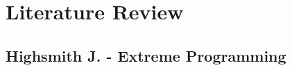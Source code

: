 \documentclass[11pt,a4paper]{report}
\begin{document}

\clearpage\maketitle
\thispagestyle{empty}

\newpage
\tableofcontents{}
\thispagestyle{empty}


\newpage

\chapter{Literature Review}\label{ch:Literature_Review}


\section{Highsmith J. - Extreme Programming}
\end{document}
